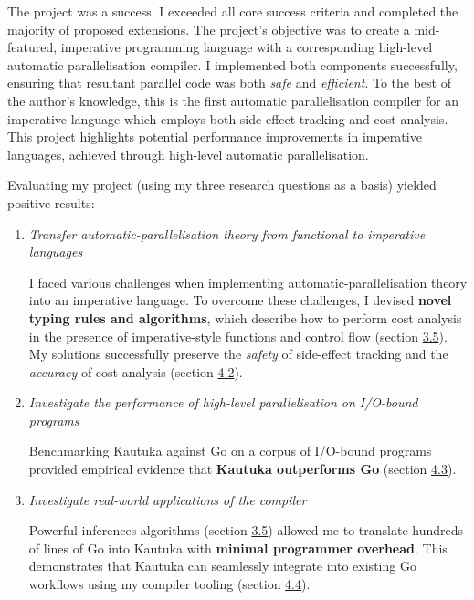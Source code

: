 



\label{sec:5}

The project was a success. I exceeded all core success criteria and completed the majority of proposed extensions. The project's objective was to create a mid-featured, imperative programming language with a corresponding high-level automatic parallelisation compiler. I implemented both components successfully, ensuring that resultant parallel code was both \textit{safe} and \textit{efficient}. To the best of the author's knowledge, this is the first automatic parallelisation compiler for an imperative language which employs both side-effect tracking and cost analysis. This project highlights potential performance improvements in imperative languages, achieved through high-level automatic parallelisation.

Evaluating my project (using my three research questions as a basis) yielded positive results: 

\begin{enumerate}[leftmargin=8mm]
  \setlength{\itemindent}{-3mm}

  \item \textit{Transfer automatic-parallelisation theory from functional to imperative languages}

  I faced various challenges when implementing automatic-parallelisation theory into an imperative language. To overcome these challenges, I devised \textbf{novel typing rules and algorithms}, which describe how to perform cost analysis in the presence of imperative-style functions and control flow (section \hyperref[sec:3.5]{3.5}). My solutions successfully preserve the \textit{safety} of side-effect tracking and the \textit{accuracy} of cost analysis (section \hyperref[sec:4.2]{4.2}).

  \item \textit{Investigate the performance of high-level parallelisation on I/O-bound programs}
    
  Benchmarking Kautuka against Go on a corpus of I/O-bound programs provided empirical evidence that \textbf{Kautuka outperforms Go} (section \hyperref[sec:4.3]{4.3}).

  \item \textit{Investigate real-world applications of the compiler}
    
  Powerful inferences algorithms (section \hyperref[sec:3.5]{3.5}) allowed me to translate hundreds of lines of Go into Kautuka with \textbf{minimal programmer overhead}. This demonstrates that Kautuka can seamlessly integrate into existing Go workflows using my compiler tooling (section \hyperref[sec:4.4]{4.4}).
  
\end{enumerate}

